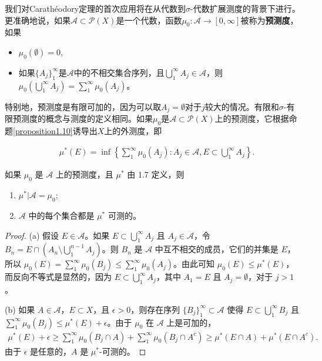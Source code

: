 \documentclass[lang=cn,10pt,thmcnt=section]{elegantbook}
\begin{document}
我们对Carathéodory定理的首次应用将在从代数到$\sigma$-代数扩展测度的背景下进行。更准确地说，如果$\mathcal{A} \subset \mathcal{P}(X)$是一个代数，函数$\mu_0 : \mathcal{A} \to [0, \infty]$被称为\textbf{预测度}，如果
\begin{itemize}
\item $\mu_0(\emptyset) = 0$,
\item 如果$\{A_j\}_{1}^{\infty}$是$\mathcal{A}$中的不相交集合序列，且$\bigcup_{1}^{\infty} A_j \in \mathcal{A}$，则$\mu_0(\bigcup_{1}^{\infty} A_j) = \sum_{1}^{\infty} \mu_0(A_j)$。
\end{itemize}

特别地，预测度是有限可加的，因为可以取$A_j = \emptyset$对于$j$较大的情况。有限和$\sigma$-有限预测度的概念与测度的定义相同。如果$\mu_0$是$\mathcal{A} \subset \mathcal{P}(X)$上的预测度，它根据命题\ref{proposition1.10}诱导出$X$上的外测度，即

\begin{align}
 \quad \mu^*(E) = \inf\left\{\sum_{1}^{\infty}\mu_0(A_j) : A_j \in \mathcal{A}, E \subset \bigcup_{1}^{\infty}A_j\right\}.
\end{align}

\begin{proposition}\label{proposition1.13}
如果 $\mu_0$ 是 $\mathcal{A}$ 上的预测度，且 $\mu^*$ 由 1.7 定义，则
\begin{enumerate}[label=\alph*.]
\item $\mu^*|\mathcal{A} = \mu_0$;
\item $\mathcal{A}$ 中的每个集合都是 $\mu^*$ 可测的。
\end{enumerate}
\end{proposition}

\begin{proof}
(a) 假设 $E \in \mathcal{A}$。如果 $E \subset \bigcup_{1}^{\infty} A_j$ 且 $A_j \in \mathcal{A}$，令 $B_n = E \cap (A_n \setminus \bigcup_{1}^{n-1} A_j)$。则 $B_n$ 是 $\mathcal{A}$ 中互不相交的成员，它们的并集是 $E$，所以 $\mu_0(E) = \sum_{1}^{\infty} \mu_0(B_j) \leq \sum_{1}^{\infty} \mu_0(A_j)$。由此可知 $\mu_0(E) \leq \mu^*(E)$，而反向不等式是显然的，因为 $E \subset \bigcup_{1}^{\infty} A_j$，其中 $A_1 = E$ 且 $A_j = \emptyset$，对于 $j > 1$。

(b) 如果 $A \in \mathcal{A}$，$E \subset X$，且 $\epsilon > 0$，则存在序列 $\{B_j\}_{1}^{\infty} \subset \mathcal{A}$ 使得 $E \subset \bigcup_{1}^{\infty} B_j$ 且 $\sum_{1}^{\infty} \mu_0(B_j) \leq \mu^*(E) + \epsilon$。由于 $\mu_0$ 在 $\mathcal{A}$ 上是可加的，
\begin{align}
\mu^*(E) + \epsilon \geq \sum_{1}^{\infty} \mu_0(B_j \cap A) + \sum_{1}^{\infty} \mu_0(B_j \cap A^c) \geq \mu^*(E \cap A) + \mu^*(E \cap A^c).
\end{align}
由于 $\epsilon$ 是任意的，$A$ 是 $\mu^*$-可测的。
\end{proof}
\end{document}
